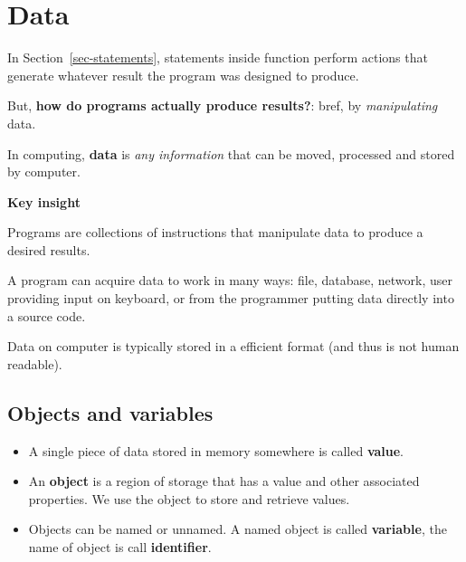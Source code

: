 \documentclass[
  letterpaper,
  DIV=11,
  numbers=noendperiod]{scrreprt}
\providecommand{\tightlist}{%
  \setlength{\itemsep}{0pt}\setlength{\parskip}{0pt}}\usepackage{longtable,booktabs,array}
\begin{document}
\hypertarget{data}{%
\section{Data}\label{data}}

In Section~\ref{sec-statements}, statements inside function perform
actions that generate whatever result the program was designed to
produce.

But, \textbf{how do programs actually produce results?}: bref, by
\emph{manipulating} data.

In computing, \textbf{data} is \emph{any information} that can be moved,
processed and stored by computer.

\begin{tcolorbox}[enhanced jigsaw, toprule=.15mm, rightrule=.15mm, opacityback=0, breakable, leftrule=.75mm, colback=white, colframe=quarto-callout-note-color-frame, arc=.35mm, left=2mm, bottomrule=.15mm]
\begin{minipage}[t]{5.5mm}
\textcolor{quarto-callout-note-color}{\faInfo}
\end{minipage}%
\begin{minipage}[t]{\textwidth - 5.5mm}

\textbf{Key insight}\vspace{2mm}

Programs are collections of instructions that manipulate data to produce
a desired results.

\end{minipage}%
\end{tcolorbox}

A program can acquire data to work in many ways: file, database,
network, user providing input on keyboard, or from the programmer
putting data directly into a source code.

Data on computer is typically stored in a efficient format (and thus is
not human readable).

\hypertarget{objects-and-variables}{%
\subsection{Objects and variables}\label{objects-and-variables}}

\begin{itemize}
\tightlist
\item
  A single piece of data stored in memory somewhere is called
  \textbf{value}.
\item
  An \textbf{object} is a region of storage that has a value and other
  associated properties. We use the object to store and retrieve values.
\item
  Objects can be named or unnamed. A named object is called
  \textbf{variable}, the name of object is call \textbf{identifier}.
\end{itemize}
\end{document}
